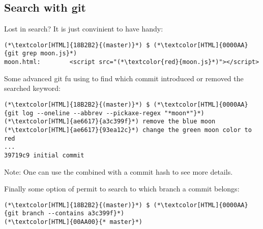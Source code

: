 \subsection{Search with git}
\begin{frame}[fragile]
  \subslidetitle
  Lost in search? It is just convinient to have  handy:
  \begin{lstlisting}
(*\textcolor[HTML]{18B2B2}{(master)}*) $ (*\textcolor[HTML]{0000AA}{git grep moon.js}*)
moon.html:        <script src="(*\textcolor{red}{moon.js}*)"></script>
\end{lstlisting}

  Some advanced git fu using  to find which commit introduced or removed the searched keyword:
  \begin{lstlisting}
(*\textcolor[HTML]{18B2B2}{(master)}*) $ (*\textcolor[HTML]{0000AA}{git log --oneline --abbrev --pickaxe-regex "*moon*"}*)
(*\textcolor[HTML]{ae6617}{a3c399f}*) remove the blue moon
(*\textcolor[HTML]{ae6617}{93ea12c}*) change the green moon color to red
...
39719c9 initial commit
\end{lstlisting}

Note: One can use the  combined with a commit hash to see more details.

  Finally some option of  permit to search to which branch a commit belongs:
  \begin{lstlisting}
(*\textcolor[HTML]{18B2B2}{(master)}*) $ (*\textcolor[HTML]{0000AA}{git branch --contains a3c399f}*)
(*\textcolor[HTML]{00AA00}{* master}*)
\end{lstlisting}
\end{frame}


